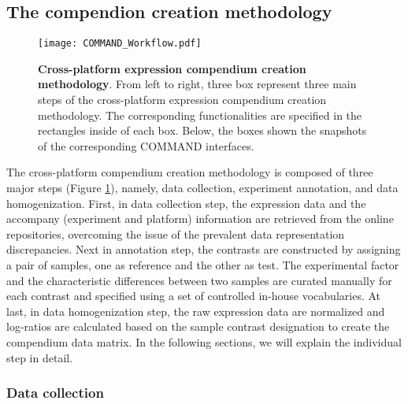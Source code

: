 \subsection{The compendion creation methodology}
\label{sec:colombos-comp-method}

\begin{figure}
  \centering
  \texttt{[image: COMMAND\_Workflow.pdf]}
  \caption[Cross-platform expression compendium creation methodology]{
    \textbf{Cross-platform expression compendium creation methodology}.  From
    left to right, three box represent three main steps of the cross-platform
    expression compendium creation methodology.  The corresponding
    functionalities are specified in the rectangles inside of each box.
    Below, the boxes shown the snapshots of the corresponding COMMAND
    interfaces.}
  \label{fig:command-workflow}
\end{figure}


The cross-platform compendium creation methodology is composed of three major
steps (Figure \ref{fig:command-workflow}), namely, data collection, experiment
annotation, and data homogenization.
%
First, in data collection step, the expression data and the accompany
(experiment and platform) information are retrieved from the online
repositories, overcoming the issue of the prevalent data representation
discrepancies.
%
Next in annotation step, the contrasts are constructed by assigning a pair of
samples, one as reference and the other as test.  The experimental factor and
the characteristic differences between two samples are curated manually for
each contrast and specified using a set of controlled in-house vocabularies.
%
At last, in data homogenization step, the raw expression data are normalized
and log-ratios are calculated based on the sample contrast designation to
create the compendium data matrix.
%
In the following sections, we will explain the individual step in detail.






\subsubsection{Data collection}


